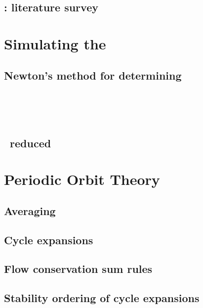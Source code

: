     \section{\KS: literature survey}
        \label{sec:KSlit}
        


\chapter{Simulating the \KSe}
\label{chap:Numerics}
    \section{Newton's method for determining \reqva}
        


\chapter{\KS\ \statesp}
    \section{\KS\ reduced \statesp}
	



\chapter{Periodic Orbit Theory}
\label{chap:POT}
    \section{Averaging}
	

    \section{Cycle expansions}
        \label{sec:cycExp}
        

    \section{Flow conservation sum rules}
        \label{s-Cons-m-flow}
        

    \section{Stability ordering of cycle expansions}
        \label{s-StabOrd}
         

